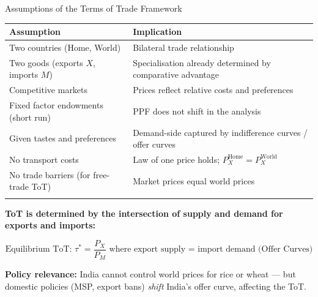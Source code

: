 \documentclass[
  ignorenonframetext,
  aspectratio=169,
]{beamer}
\makeatletter
\let\quarto@originallabel\label
\DeclareRobustCommand*{\label}[1]{\quarto@originallabel{#1}}
\makeatother
\begin{document}
\begin{frame}{Assumptions of the Terms of Trade Framework}
\label{assumptions-of-the-terms-of-trade-framework}
\begin{longtable}[]{@{}
  >{\raggedright\arraybackslash}p{}
  >{\raggedright\arraybackslash}p{}@{}}
\toprule\noalign{}
\begin{minipage}[b]{\linewidth}\raggedright
Assumption
\end{minipage} & \begin{minipage}[b]{\linewidth}\raggedright
Implication
\end{minipage} \\
\midrule\noalign{}
\endhead
Two countries (Home, World) & Bilateral trade relationship \\
Two goods (exports \(X\), imports \(M\)) & Specialisation already
determined by comparative advantage \\
Competitive markets & Prices reflect relative costs and preferences \\
Fixed factor endowments (short run) & PPF does not shift in the
analysis \\
Given tastes and preferences & Demand-side captured by indifference
curves / offer curves \\
No transport costs & Law of one price holds;
\(P_X^{\text{Home}} = P_X^{\text{World}}\) \\
No trade barriers (for free-trade ToT) & Market prices equal world
prices \\
\bottomrule\noalign{}
\end{longtable}

\textbf{ToT is determined by the intersection of supply and demand for
exports and imports:}

\[\text{Equilibrium ToT: } \tau^* = \frac{P_X}{P_M} \text{ where export supply = import demand (Offer Curves)}\]

\textbf{Policy relevance:} India cannot control world prices for rice or
wheat --- but domestic policies (MSP, export bans) \emph{shift} India's
offer curve, affecting the ToT.
\end{frame}
\end{document}
